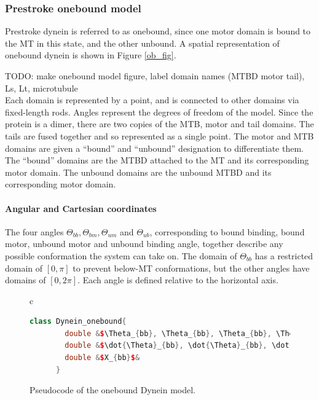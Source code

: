 \documentclass[10pt]{article} %
\begin{document}
\subsubsection{Prestroke onebound model}
Prestroke dynein is referred to as onebound, since one motor domain is bound to the MT in this state, and the other unbound. A spatial representation of onebound dynein is shown in Figure \ref{ob_fig}. 


TODO: make onebound model figure, label domain names (MTBD motor tail), Ls, Lt, microtubule\\

Each domain is represented by a point, and is connected to other domains via fixed-length rods. Angles represent the degrees of freedom of the model. Since the protein is a dimer, there are two copies of the MTB, motor and tail domains. The tails are fused together and so represented as a single point. The motor and MTB domains are given a ``bound'' and ``unbound'' designation to differentiate them. The ``bound'' domains are the MTBD attached to the MT and its corresponding motor domain. The unbound domains are the unbound MTBD and its corresponding motor domain.\\

\paragraph{Angular and Cartesian coordinates}

The four angles $\Theta_{bb}, \Theta_{bm}, \Theta_{um}$ and $\Theta_{ub}$, corresponding to bound binding, bound motor, unbound motor and unbound binding angle, together describe any possible conformation the system can take on. The domain of $\Theta_{bb}$ has a restricted domain of $[0,\pi]$ to prevent below-MT conformations, but the other angles have domains of $[0,2\pi]$. Each angle is defined relative to the horizontal axis.\\

\begin{figure}[h]
  \centering
  \begin{tabular}{c}
    \begin{lstlisting}[language=C++]
      class Dynein_onebound{
        double &$\Theta_{bb}, \Theta_{bb}, \Theta_{bb}, \Theta_{bb}$&
        double &$\dot{\Theta}_{bb}, \dot{\Theta}_{bb}, \dot{\Theta}_{bb}, \dot{\Theta}_{bb}$&
        double &$X_{bb}$&
      }
    \end{lstlisting}
  \end{tabular}
  \caption{Pseudocode of the onebound Dynein model.}
  \label{ob_struct}
\end{figure}
\end{document}
